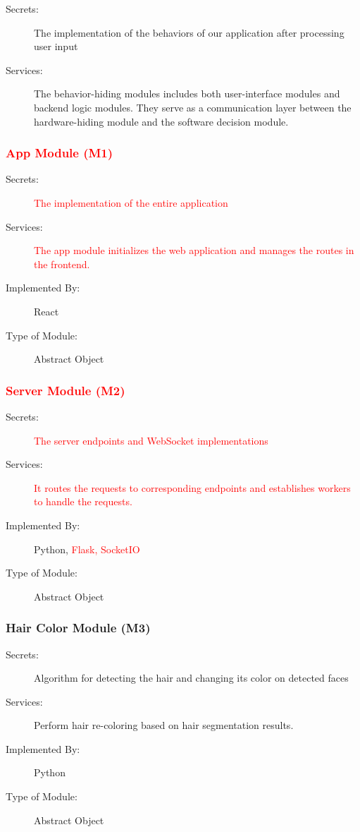 \documentclass[12pt, titlepage]{article}
\begin{document}
\begin{description}
\item[Secrets:]The implementation of the behaviors of our application after processing user input
\item[Services:] The behavior-hiding modules includes both user-interface modules and backend logic modules. They serve as a communication layer between the
  hardware-hiding module and the software decision module.
\end{description}

\subsubsection{\textcolor{red}{App Module (M1)}}

\color{red}
\begin{description}
\item[Secrets:] \textcolor{red}{The implementation of the entire application}
\item[Services:]\textcolor{red}{The app module initializes the web application and manages the routes in the frontend.}
\item[Implemented By:] React
\item[Type of Module:] Abstract Object
\end{description}
\color{black}

\subsubsection{\textcolor{red}{Server Module (M2)}}

\begin{description}
\item[Secrets:] \textcolor{red}{The server endpoints and WebSocket implementations}
\item[Services:]\textcolor{red}{It routes the requests to corresponding endpoints and establishes workers to handle the requests.}
\item[Implemented By:] Python, \textcolor{red}{Flask, SocketIO}
\item[Type of Module:] Abstract Object
\end{description}

\subsubsection{Hair Color Module (M3)}

\begin{description}
\item[Secrets:]Algorithm for detecting the hair and changing its color on detected faces
\item[Services:] Perform hair re-coloring based on hair segmentation results.
\item[Implemented By:] Python
\item[Type of Module:] Abstract Object
\end{description}
\end{document}
